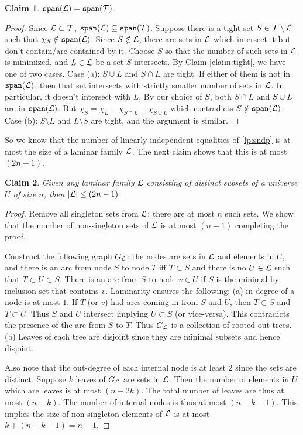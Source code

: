 \documentclass[11pt]{article}
\newtheorem{claim}{Claim}
\begin{document}
\begin{claim}
${\tt span}({\mathcal L}) = {\tt span}({\mathcal T})$.
\end{claim}
\begin{proof}
Since ${\mathcal L}\subset {\mathcal T}$, ${\tt span}({\mathcal L})\subseteq {\tt span}({\mathcal T})$. Suppose there is a tight set $S\in {\mathcal T}\setminus {\mathcal L}$
such that $\chi_S \notin {\tt span}({\mathcal L})$. Since $S\notin {\mathcal L}$, there are sets in ${\mathcal L}$  which intersect it but don't contain/are contained by it. Choose $S$ so that the number of such sets in ${\mathcal L}$ is minimized, and $L\in {\mathcal L}$
be a set $S$ intersects. By Claim \ref{claim:tight}, we have one of two cases. Case (a): $S\cup L$ and $S\cap L$ are tight. If either of them is not in ${\tt span}({\mathcal L})$, then that set intersects with strictly smaller number of sets in ${\mathcal L}$.
In particular, it doesn't intersect with $L$. By our choice of $S$, both $S\cap L$ and $S\cup L$ are in ${\tt span}({\mathcal L})$.
But $\chi_{S} = \chi_L - \chi_{S\cap L} - \chi_{S\cup L}$ which contradicts $S\notin {\tt span}({\mathcal L})$.
Case (b): $S\setminus L$ and $L\setminus S$ are tight, and the argument is similar.
\end{proof}

\noindent
So we know that the number of linearly independent equalities of \eqref{lp:sndp} is at most the size of a laminar family ${\mathcal L}$. The next claim shows that this is at most $(2n -1)$.

\noindent
\begin{claim}
Given any laminar family ${\mathcal L}$ consisting of distinct subsets of a universe $U$ of size $n$, then
$|{\mathcal L}| \le (2n -1)$.
\end{claim}
\begin{proof}
Remove all singleton sets from ${\mathcal L}$; there are at most $n$ such sets. We show that the number of non-singleton sets of ${\mathcal L}$ is at most $(n-1)$ completing the proof.

Construct the following graph $G_{\mathcal L}$: the nodes are sets in ${\mathcal L}$ and elements in $U$, and there is an arc from node $S$ to node $T$ iff $T\subset S$ and there is no $U\in {\mathcal L}$ such that $T\subset U\subset S$. 
There is an arc from $S$ to node $v\in U$ if $S$ is the minimal by inclusion set that contains $v$.
Laminarity ensures the following: (a) in-degree of a node is at most $1$. If $T$ (or $v$) had arcs coming in from $S$ and $U$, then $T\subset S$ and $T\subset U$. Thus $S$ and $U$ intersect implying $U\subset S$ (or vice-versa). This contradicts the presence of the arc from $S$ to $T$. Thus $G_{\mathcal L}$ is a collection of rooted 
out-trees. (b) Leaves of each tree are disjoint since they are minimal subsets and hence disjoint.

Also note that the out-degree of each internal node is at least $2$ since the sets are distinct. Suppose $k$ leaves of $G_{\mathcal L}$ are sets in ${\mathcal L}$. Then the number of elements in $U$ which are leaves is at most $(n-2k)$.
The total number of leaves are thus at most $(n-k)$. The number of internal nodes is thus at most 
$(n-k -1)$. This implies the size of non-singleton elements of ${\mathcal L}$ is at most $k + (n - k - 1) = n-1$.
\end{proof}
\end{document}
